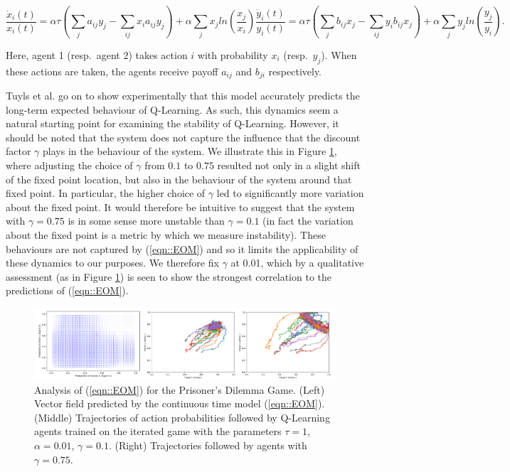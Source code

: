 \documentclass{article}
\begin{document}
\begin{subequations}
\label{eqn::EOM}
    \begin{equation}
        \frac{\dot{x}_i(t)}{x_i(t)} = \alpha \tau (\sum_{j} a_{ij} y_j - \sum_{i j} x_i a_{ij} y_j)
        + \alpha \sum_j x_j ln(\frac{x_j}{x_i}) 
    \end{equation}
    \begin{equation}
        \frac{\dot{y}_i(t)}{y_i(t)} = \alpha \tau (\sum_{j} b_{ij} x_j - \sum_{i j} y_i b_{ij} x_j)
        + \alpha \sum_j y_j ln(\frac{y_j}{y_i}).
    \end{equation}
\end{subequations}

Here,
agent 1 (resp.~agent 2) takes action $i$ with probability
$x_i$ (resp.~$y_j$).
When these actions are taken, the agents
receive payoff $a_{ij}$ and $b_{ji}$ respectively.

Tuyls et al. go on to show experimentally that this model accurately predicts the long-term expected behaviour of Q-Learning. As such, this dynamics seem a natural starting point for examining the stability of Q-Learning. However, it should be noted that the system does not capture the influence that the discount factor $\gamma$ plays in the behaviour of the system. We illustrate this in Figure \ref{fig:Gamma Var}, where 
adjusting the choice of $\gamma$ from $0.1$ to $0.75$ resulted not only in a slight shift of the fixed point location, but also in the behaviour of the system around that fixed point. In particular, the higher choice of $\gamma$ led to significantly more variation about the fixed point. It would therefore be intuitive to suggest that the system with $\gamma = 0.75$ is in some sense more unstable than $\gamma = 0.1$ (in fact the variation about the fixed point is a metric by which we measure instability). These behaviours are not captured by (\ref{eqn::EOM}) and so it limits the applicability of these dynamics to our purposes. We therefore fix $\gamma$ at 0.01, which by a qualitative assessment (as in Figure \ref{fig:Gamma Var}) is seen to show the strongest correlation to the predictions of (\ref{eqn::EOM}).

\begin{figure}[t]
    \centering
    \includegraphics[width = \linewidth]{Figures/Gamma Var.png}
    \caption{Analysis of (\ref{eqn::EOM}) for the Prisoner's Dilemma Game. (Left) Vector field predicted by the continuous time model (\ref{eqn::EOM}). (Middle) Trajectories of action probabilities followed by Q-Learning agents trained on the iterated game with the parameters $\tau = 1$, $\alpha = 0.01$, $\gamma = 0.1$. (Right) Trajectories followed by agents with $\gamma = 0.75$.}
    \label{fig:Gamma Var}
\end{figure}
\end{document}
